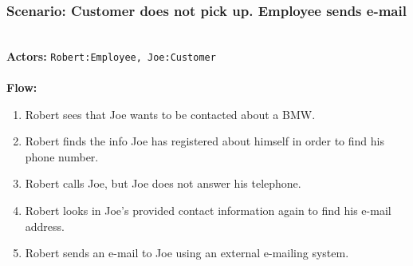 \subsubsection{Scenario: Customer does not pick up. Employee sends e-mail}
\HRule \\[0.4cm]
\textbf{Actors:} \texttt{Robert:Employee, Joe:Customer}\\
\HRule \\[0.4cm]
\textbf{Flow:} \\
\begin{enumerate}
\item Robert sees that Joe wants to be contacted about a BMW.
\item Robert finds the info Joe has registered about himself in order to find his phone number.
\item Robert calls Joe, but Joe does not answer his telephone.
\item Robert looks in Joe's provided contact information again to find his e-mail address.
\item Robert sends an e-mail to Joe using an external e-mailing system.
\end{enumerate}
\HRule \\[0.4cm]
